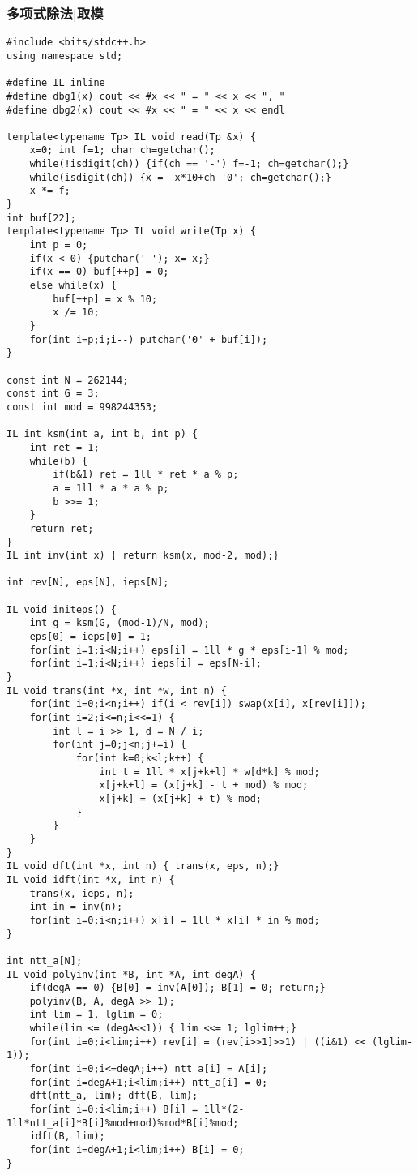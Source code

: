 \documentclass[UTF8]{ctexart}
\begin{document}
\subsubsection{多项式除法|取模}
\begin{framed}
\begin{lstlisting}
#include <bits/stdc++.h>
using namespace std;

#define IL inline
#define dbg1(x) cout << #x << " = " << x << ", "
#define dbg2(x) cout << #x << " = " << x << endl

template<typename Tp> IL void read(Tp &x) {
    x=0; int f=1; char ch=getchar();
    while(!isdigit(ch)) {if(ch == '-') f=-1; ch=getchar();}
    while(isdigit(ch)) {x =  x*10+ch-'0'; ch=getchar();}
    x *= f;
}
int buf[22];
template<typename Tp> IL void write(Tp x) {
    int p = 0;
    if(x < 0) {putchar('-'); x=-x;}
    if(x == 0) buf[++p] = 0;
    else while(x) {
        buf[++p] = x % 10;
        x /= 10;
    }
    for(int i=p;i;i--) putchar('0' + buf[i]);
}

const int N = 262144;
const int G = 3;
const int mod = 998244353;

IL int ksm(int a, int b, int p) {
    int ret = 1;
    while(b) {
        if(b&1) ret = 1ll * ret * a % p;
        a = 1ll * a * a % p;
        b >>= 1;
    }
    return ret;
}
IL int inv(int x) { return ksm(x, mod-2, mod);}

int rev[N], eps[N], ieps[N];

IL void initeps() {
    int g = ksm(G, (mod-1)/N, mod);
    eps[0] = ieps[0] = 1;
    for(int i=1;i<N;i++) eps[i] = 1ll * g * eps[i-1] % mod;
    for(int i=1;i<N;i++) ieps[i] = eps[N-i];
}
IL void trans(int *x, int *w, int n) {
    for(int i=0;i<n;i++) if(i < rev[i]) swap(x[i], x[rev[i]]);
    for(int i=2;i<=n;i<<=1) {
        int l = i >> 1, d = N / i;
        for(int j=0;j<n;j+=i) {
            for(int k=0;k<l;k++) {
                int t = 1ll * x[j+k+l] * w[d*k] % mod;
                x[j+k+l] = (x[j+k] - t + mod) % mod;
                x[j+k] = (x[j+k] + t) % mod;
            }
        }
    }
}
IL void dft(int *x, int n) { trans(x, eps, n);}
IL void idft(int *x, int n) {
    trans(x, ieps, n);
    int in = inv(n);
    for(int i=0;i<n;i++) x[i] = 1ll * x[i] * in % mod;
}

int ntt_a[N];
IL void polyinv(int *B, int *A, int degA) {
    if(degA == 0) {B[0] = inv(A[0]); B[1] = 0; return;}
    polyinv(B, A, degA >> 1);
    int lim = 1, lglim = 0;
    while(lim <= (degA<<1)) { lim <<= 1; lglim++;}
    for(int i=0;i<lim;i++) rev[i] = (rev[i>>1]>>1) | ((i&1) << (lglim-1));
    for(int i=0;i<=degA;i++) ntt_a[i] = A[i];
    for(int i=degA+1;i<lim;i++) ntt_a[i] = 0;
    dft(ntt_a, lim); dft(B, lim);
    for(int i=0;i<lim;i++) B[i] = 1ll*(2-1ll*ntt_a[i]*B[i]%mod+mod)%mod*B[i]%mod;
    idft(B, lim);
    for(int i=degA+1;i<lim;i++) B[i] = 0;
}


\end{lstlisting}
\end{framed}
\end{document}
